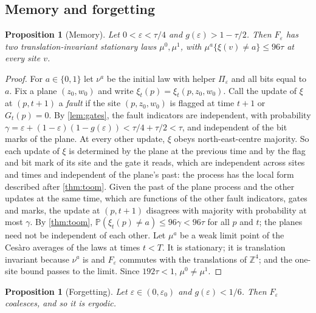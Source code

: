 \documentclass[11pt]{article}
\theoremstyle{plain}
\newtheorem{proposition}[theorem]{Proposition}
\theoremstyle{definition}
\theoremstyle{remark}
\newcommand{\Z}{\mathbb Z}
\newcommand{\Prob}{\mathbb P}
\newcommand{\eps}{\varepsilon}
\begin{document}
\subsection{Memory and forgetting}

\begin{proposition}[Memory]\label{prop:memory}
Let $0<\eps<\tau/4$ and $g(\eps)>1-\tau/2$. Then $F_\eps$ has two translation-invariant stationary laws $\mu^0,\mu^1$, with $\mu^a\{\xi(v)\ne a\}\le96\tau$ at every site $v$.
\end{proposition}

\begin{proof}
For $a\in\{0,1\}$ let $\nu^a$ be the initial law with helper $\Pi_\eps$ and all bits equal to $a$. Fix a plane $(z_0,w_0)$ and write $\xi_t(p)=\xi_t(p,z_0,w_0)$. Call the update of $\xi$ at $(p,t+1)$ a \emph{fault} if the site $(p,z_0,w_0)$ is flagged at time $t+1$ or $G_t(p)=0$. By \cref{lem:gates}, the fault indicators are independent, with probability $\gamma=\eps+(1-\eps)(1-g(\eps))<\tau/4+\tau/2<\tau$, and independent of the bit marks of the plane. At every other update, $\xi$ obeys north-east-centre majority. So each update of $\xi$ is determined by the plane at the previous time and by the flag and bit mark of its site and the gate it reads, which are independent across sites and times and independent of the plane's past: the process has the local form described after \cref{thm:toom}. Given the past of the plane process and the other updates at the same time, which are functions of the other fault indicators, gates and marks, the update at $(p,t+1)$ disagrees with majority with probability at most $\gamma$. By \cref{thm:toom}, $\Prob(\xi_t(p)\ne a)\le96\gamma<96\tau$ for all $p$ and $t$; the planes need not be independent of each other. Let $\mu^a$ be a weak limit point of the Ces\`aro averages of the laws at times $t<T$. It is stationary; it is translation invariant because $\nu^a$ is and $F_\eps$ commutes with the translations of $\Z^4$; and the one-site bound passes to the limit. Since $192\tau<1$, $\mu^0\ne\mu^1$.
\end{proof}

\begin{proposition}[Forgetting]\label{prop:forgetting}
Let $\eps\in(0,\eps_0)$ and $g(\eps)<1/6$. Then $F_\eps$ coalesces, and so it is ergodic.
\end{proposition}
\end{document}
